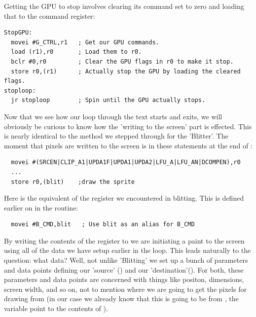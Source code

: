 Getting the GPU to stop involves clearing its command set to zero and loading that to the command register:
\begin{lstlisting}
StopGPU:
  movei #G_CTRL,r1   ; Get our GPU commands.
  load (r1),r0       ; Load them to r0.
  bclr #0,r0         ; Clear the GPU flags in r0 to make it stop.
  store r0,(r1)      ; Actually stop the GPU by loading the cleared flags.
stoploop:
  jr stoploop        ; Spin until the GPU actually stops.
\end{lstlisting}

Now that we see how our loop through the text starts and exits, we will obviously be curious to know how the 'writing
to the screen' part is effected. This is nearly identical to the method we stepped through for the 'Blitter'. The moment
that pixels are written to the screen is in these statements at the end of :

\begin{lstlisting}
  movei #(SRCEN|CLIP_A1|UPDA1F|UPDA1|UPDA2|LFU_A|LFU_AN|DCOMPEN),r0
  ...
  store r0,(blit)    ;draw the sprite
\end{lstlisting}

Here  is the equivalent of the  register we encountered in blitting. This is defined earlier on in the routine:
\begin{lstlisting}
  movei #B_CMD,blit   ; Use blit as an alias for B_CMD
\end{lstlisting}

By writing the contents of the
 register to  we are initiating a paint to the screen using all of the data we have setup earlier in the loop. This leads
naturally to the question: what data? Well, not unlike 'Blitting' we set up a bunch of parameters and data points defining our 'source' () and
our 'destination'(). For both, these parameters and data points are concerned with things like positon, dimensions, screen width, and so on, not
to mention where we are going to get the pixels for drawing from (in our case we already know that this is going to be from , the variable
point to the contents of ).

